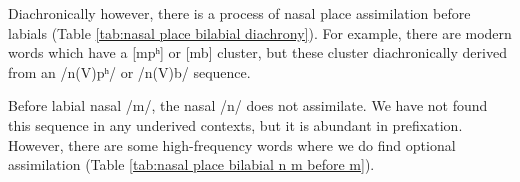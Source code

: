   	Diachronically however, there is a process of nasal place assimilation before labials (Table \ref{tab:nasal place bilabial diachrony}). For example, there are modern words which have a [mpʰ] or [mb] cluster, but these cluster diachronically derived from an /n(V)pʰ/ or /n(V)b/ sequence. 
  	
  	
  	\begin{table}[H]
    \centering
    \caption{Diachronic nasal place assimilation before bilabial stops}
    \label{tab:nasal place bilabial diachrony}
  	\end{table}
  	
  	
  	
  	
  	
  	Before labial nasal /m/, the nasal /n/ does not assimilate. We have not found this sequence in any underived contexts, but it is abundant in prefixation. However, there are some high-frequency words where we do find optional assimilation (Table \ref{tab:nasal place bilabial n m before m}). 
  	
